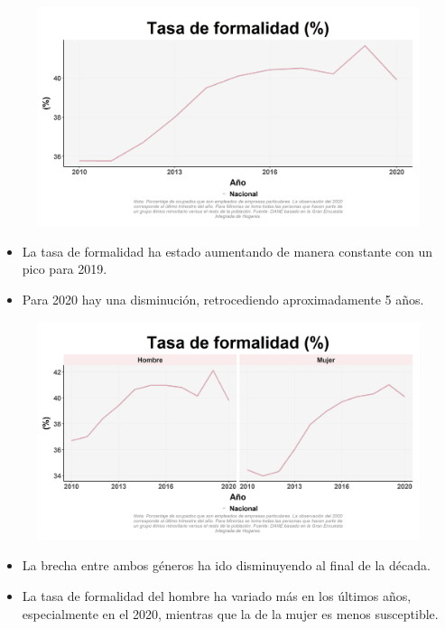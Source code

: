     \begin{figure}[H]
        \caption[Tasa de formalidad por ciudades a nivel nacional ]{\label{formal_nal_trend} }
        \begin{center}
        \includegraphics[width=\textwidth,keepaspectratio]{img/var_60_trend.png}
        \end{center}
    \end{figure}
            \begin{itemize}
                \item La tasa de formalidad ha estado aumentando de manera constante con un pico para 2019.
                \item Para 2020 hay una disminución, retrocediendo aproximadamente 5 años.
                \end{itemize}

    \begin{figure}[H]
        \caption[Tasa de formalidad por género ]{\label{formal_gen_trend} }
        \begin{center}
        \includegraphics[width=\textwidth,keepaspectratio]{img/var_59_trend.png}
        \end{center}
    \end{figure}
            \begin{itemize}
                \item La brecha entre ambos géneros ha ido disminuyendo al final de la década.
                \item La tasa de formalidad del hombre ha variado más en los últimos años, especialmente en el 2020, mientras que la de la mujer es menos susceptible.
                \end{itemize}

